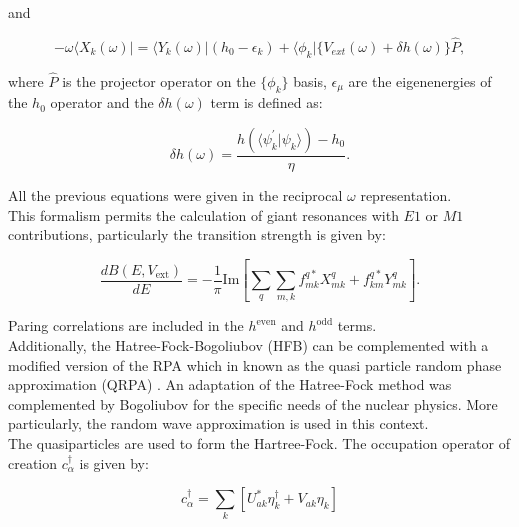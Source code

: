 \documentclass[openany]{book}
\begin{document}
and 

\begin{equation}\label{eq:micro_FAM_Y}
	- \omega \langle X_k(\omega) | =  \langle Y_k(\omega) | (h_0 - \epsilon_k) + \langle \phi_k | \{V_{ext}(\omega) + \delta h (\omega)\}  \hat{P},
\end{equation}

where $\hat{P}$ is the projector operator on the $\{\phi_k\}$ basis, $\epsilon_\mu$ are the eigenenergies of the $h_0$ operator and the $\delta h(\omega)$ term is defined as:

\begin{equation}\label{eq:micro_FAM_deltah}
	\delta h(\omega) = \frac{h(\langle \psi^{'}_k| \psi_k \rangle ) - h_0}{\eta}.
\end{equation}

All the previous equations were given in the reciprocal $\omega$ representation.  \\

This formalism permits the calculation of giant resonances with $E1$ or $M1$ contributions, particularly the transition strength is given by: 

\begin{equation}\label{eq:micro_FAM_transitionStrength}
	\frac{dB(E, V_{\mathrm{ext}})}{dE} =  - \frac{1}{\pi} \mathrm{Im} \left[\sum_{q} \sum_{m, k} {f^{q*}_{mk}X^{q}_{mk} + f^{q*}_{km}Y^{q}_{mk} } \right].
\end{equation}

Paring correlations are included in the $h^{\mathrm{even}}$ and $h^{\mathrm{odd}}$ terms. \\


Additionally, the Hatree-Fock-Bogoliubov (HFB) can be complemented with a modified version of the RPA which in known as the quasi particle random phase approximation (QRPA) \cite{chimanski_in_escher_peru_younes_2022}. An adaptation of the Hatree-Fock method was complemented by Bogoliubov for the specific needs of the nuclear physics. More particularly, the random wave approximation is used in this context.  \\

The quasiparticles are used to form the Hartree-Fock. The occupation operator of creation $c^{\dagger}_\alpha$ is given by:

\begin{equation}\label{eq:micro_HFB_creation}
	c^{\dagger}_\alpha = \sum_{k} [U^{*}_{ak} \eta^{\dagger}_k + V_{ak} \eta_k]
\end{equation}
\end{document}
